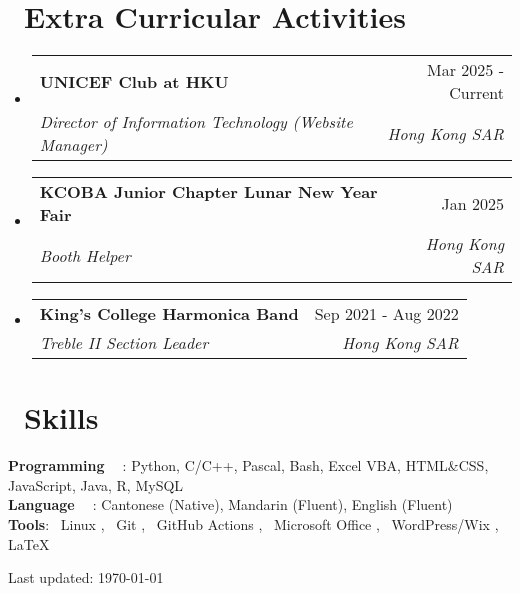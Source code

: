 \documentclass[a4paper,11pt]{article}
\makeatletter
\newcommand{\simpleicon}[2]{
  #1~#2
}
\newcommand{\iconsection}[2]{
  \section[#2]{#1~#2}
}
\newcommand{\resumeSubheading}[4]{
  \vspace{-2pt}\item
    \begin{tabular*}{0.97\textwidth}[t]{l@{\extracolsep{\fill}}r}
      \textbf{#1} & #2 \\
      \textit{\small#3} & \textit{\small #4} \\
    \end{tabular*}\vspace{-7pt}
}
\newcommand{\resumeSubHeadingListStart}{\begin{itemize}[leftmargin=0.15in, label={}]}
\newcommand{\resumeSubHeadingListEnd}{\end{itemize}}
\makeatother
\begin{document}
\iconsection{\faPeopleCarry}{Extra Curricular Activities}
  \resumeSubHeadingListStart
    \resumeSubheading
      {UNICEF Club at HKU}{Mar 2025 - Current}
      {Director of Information Technology (Website Manager)}{Hong Kong SAR}
    \resumeSubheading
      {KCOBA Junior Chapter Lunar New Year Fair}{Jan 2025}
      {Booth Helper}{Hong Kong SAR}
    \resumeSubheading
      {King's College Harmonica Band}{Sep 2021 - Aug 2022}
      {Treble II Section Leader}{Hong Kong SAR}
  \resumeSubHeadingListEnd

\iconsection{\faTools}{Skills}
  \begin{itemize}[leftmargin=0.15in, label={}]
    \small{\item{
      \textbf{Programming \simpleicon{\faCode}{}}{: Python, C/C++, Pascal, Bash, Excel VBA, HTML\&CSS, JavaScript, Java, R, MySQL} \\
      \textbf{Language \simpleicon{\faLanguage}{}}{: Cantonese (Native), Mandarin (Fluent), English (Fluent)} \\
      \textbf{Tools}{: \simpleicon{\faLinux}{Linux}, \simpleicon{\faGit}{Git}, \simpleicon{\faGithub}{GitHub Actions}, \simpleicon{\faMicrosoft}{Microsoft Office}, \simpleicon{\faWordpress}{WordPress/Wix}, \LaTeX}
    }}
  \end{itemize}

\vfill
\begin{center}
\footnotesize
Last updated: \today
\end{center}
\end{document}
